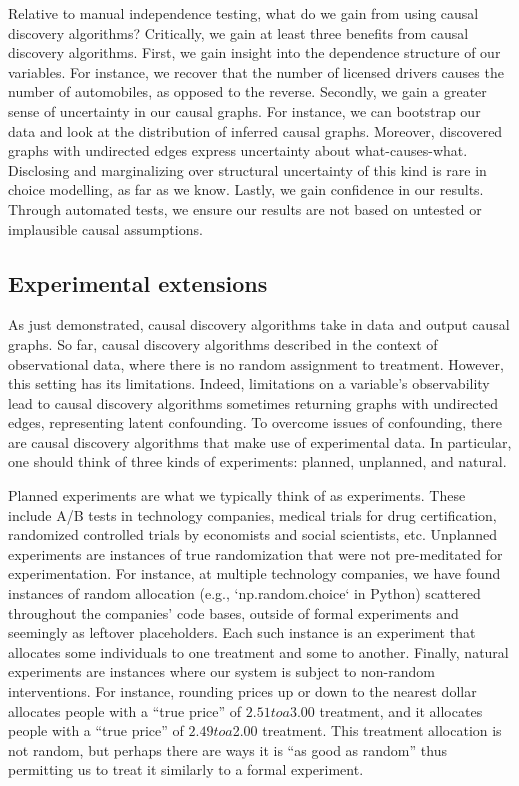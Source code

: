 Relative to manual independence testing, what do we gain from using causal discovery algorithms?
Critically, we gain at least three benefits from causal discovery algorithms.
First, we gain insight into the dependence structure of our variables.
For instance, we recover that the number of licensed drivers causes the number of automobiles, as opposed to the reverse.
Secondly, we gain a greater sense of uncertainty in our causal graphs.
For instance, we can bootstrap our data and look at the distribution of inferred causal graphs.
Moreover, discovered graphs with undirected edges express uncertainty about what-causes-what.
Disclosing and marginalizing over structural uncertainty of this kind is rare in choice modelling, as far as we know.
Lastly, we gain confidence in our results.
Through automated tests, we ensure our results are not based on untested or implausible causal assumptions.

\subsection{Experimental extensions}
\label{sec:experimental-extension}

As just demonstrated, causal discovery algorithms take in data and output causal graphs.
So far, causal discovery algorithms described in the context of observational data, where there is no random assignment to treatment.
However, this setting has its limitations.
Indeed, limitations on a variable's observability lead to causal discovery algorithms sometimes returning graphs with undirected edges, representing latent confounding.
To overcome issues of confounding, there are causal discovery algorithms that make use of experimental data.
In particular, one should think of three kinds of experiments: planned, unplanned, and natural.

Planned experiments are what we typically think of as experiments.
These include A/B tests in technology companies, medical trials for drug certification, randomized controlled trials by economists and social scientists, etc.
Unplanned experiments are instances of true randomization that were not pre-meditated for experimentation.
For instance, at multiple technology companies, we have found instances of random allocation (e.g., `np.random.choice` in Python) scattered throughout the companies' code bases, outside of formal experiments and seemingly as leftover placeholders.
Each such instance is an experiment that allocates some individuals to one treatment and some to another.
Finally, natural experiments are instances where our system is subject to non-random interventions.
For instance, rounding prices up or down to the nearest dollar allocates people with a ``true price'' of $2.51 to a $3.00 treatment, and it allocates people with a ``true price'' of $2.49 to a $2.00 treatment.
This treatment allocation is not random, but perhaps there are ways it is ``as good as random'' thus permitting us to treat it similarly to a formal experiment.

